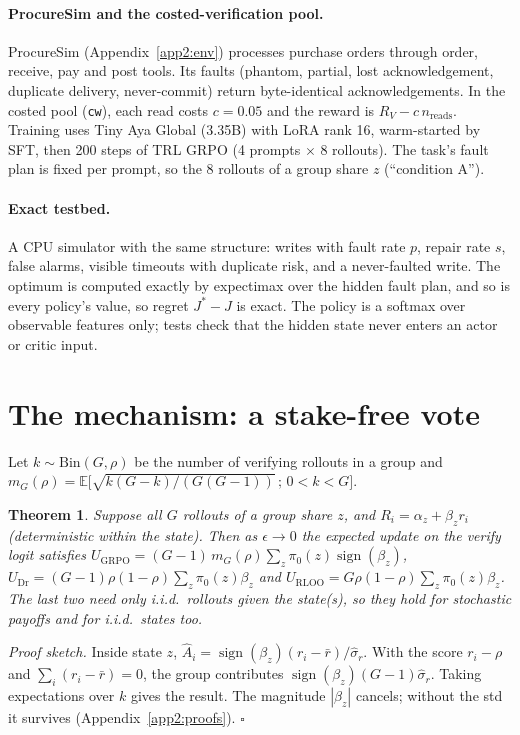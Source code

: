 \documentclass[11pt]{article}
\newtheorem{theorem}{Theorem}
\newcommand{\sgn}{\operatorname{sign}}
\begin{document}
\paragraph{ProcureSim and the costed-verification pool.} ProcureSim (Appendix~\ref{app2:env}) processes purchase
orders through order, receive, pay and post tools. Its faults (phantom, partial, lost acknowledgement, duplicate
delivery, never-commit) return byte-identical acknowledgements. In the costed pool (\texttt{cw}), each read costs
$c=0.05$ and the reward is $R_V-c\,n_{\mathrm{reads}}$. Training uses Tiny Aya Global (3.35B) with LoRA rank 16,
warm-started by SFT, then 200 steps of TRL GRPO (4 prompts $\times$ 8 rollouts). The task's fault plan is fixed
per prompt, so the 8 rollouts of a group share $z$ (``condition A'').

\paragraph{Exact testbed.} A CPU simulator with the same structure: writes with fault rate $p$, repair rate $s$,
false alarms, visible timeouts with duplicate risk, and a never-faulted write. The optimum is computed exactly by
expectimax over the hidden fault plan, and so is every policy's value, so regret $J^*-J$ is exact. The policy is a
softmax over observable features only; tests check that the hidden state never enters an actor or critic input.

\section{The mechanism: a stake-free vote}\label{sec:mech}

Let $k\sim\mathrm{Bin}(G,\rho)$ be the number of verifying rollouts in a group and
$m_G(\rho)=\mathbb E\big[\sqrt{k(G-k)/(G(G-1))}\,;\,0<k<G\big]$.

\begin{theorem}\label{thm:vote}
Suppose all $G$ rollouts of a group share $z$, and $R_i=\alpha_z+\beta_z r_i$ (deterministic within the state).
Then as $\epsilon\to0$ the expected update on the verify logit satisfies
$U_{\mathrm{GRPO}}=(G{-}1)\,m_G(\rho)\sum_z\pi_0(z)\sgn(\beta_z)$,
$U_{\mathrm{Dr}}=(G{-}1)\rho(1{-}\rho)\sum_z\pi_0(z)\beta_z$ and
$U_{\mathrm{RLOO}}=G\rho(1{-}\rho)\sum_z\pi_0(z)\beta_z$.
The last two need only i.i.d.\ rollouts given the state(s), so they hold for stochastic payoffs and for i.i.d.\
states too.
\end{theorem}
\noindent\emph{Proof sketch.} Inside state $z$, $\hat A_i=\sgn(\beta_z)(r_i-\bar r)/\hat\sigma_r$. With the score
$r_i-\rho$ and $\sum_i(r_i-\bar r)=0$, the group contributes $\sgn(\beta_z)(G-1)\hat\sigma_r$. Taking expectations
over $k$ gives the result. The magnitude $|\beta_z|$ cancels; without the std it survives
(Appendix~\ref{app2:proofs}). $\square$
\end{document}
